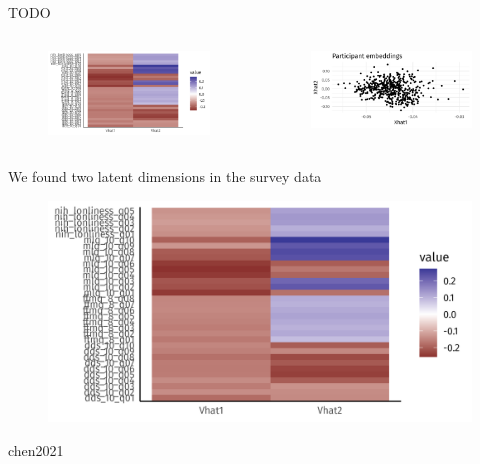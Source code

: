 \documentclass[aspectratio=169]{beamer}
\theoremstyle{remark}
\begin{document}
\begin{frame}{TODO}
    \begin{columns}
        \centering
        \begin{figure}
            \includegraphics{figures/vhat.png}
        \end{figure}
        \centering
        \begin{figure}
            \includegraphics{figures/xhat.png}
        \end{figure}
    \end{columns}
\end{frame}

\begin{frame}{We found two latent dimensions in the survey data}

    \begin{figure}
        \includegraphics{figures/vhat.png}
    \end{figure}
    \cite{chen2021}
    chen2021
\end{frame}
\end{document}
